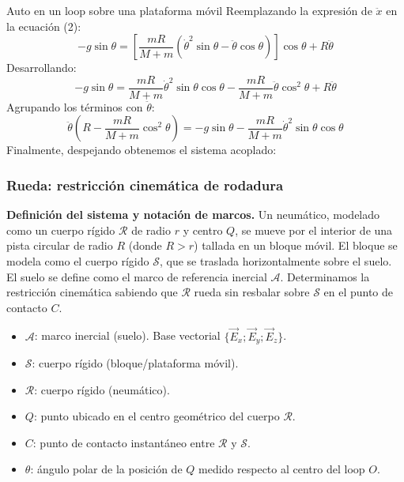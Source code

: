 \begin{solucion}{Auto en un loop sobre una plataforma móvil}
Reemplazando la expresión de $\ddot{x}$ en la ecuación (2):
\begin{equation*}
-g\sin\theta = \left[ \frac{mR}{M+m}\left(\dot{\theta}^2\sin\theta - \ddot{\theta}\cos\theta\right) \right]\cos\theta + R\ddot{\theta}
\end{equation*}
Desarrollando:
\begin{equation*}
-g\sin\theta = \frac{mR}{M+m}\dot{\theta}^2\sin\theta\cos\theta - \frac{mR}{M+m}\ddot{\theta}\cos^2\theta + R\ddot{\theta}
\end{equation*}
Agrupando los términos con $\ddot{\theta}$:
\begin{equation*}
\ddot{\theta} \left( R - \frac{mR}{M+m}\cos^2\theta \right) = -g\sin\theta - \frac{mR}{M+m}\dot{\theta}^2\sin\theta\cos\theta
\end{equation*}
Finalmente, despejando obtenemos el sistema acoplado:

\subsubsection*{Rueda: restricción cinemática de rodadura}

\textbf{Definición del sistema y notación de marcos.}
Un neumático, modelado como un cuerpo rígido $\mathcal{R}$ de radio $r$ y centro $Q$, se mueve por el interior de una pista circular de radio $R$ (donde $R > r$) tallada en un bloque móvil. El bloque se modela como el cuerpo rígido $\mathcal{S}$, que se traslada horizontalmente sobre el suelo. El suelo se define como el marco de referencia inercial $\mathcal{A}$. Determinamos la restricción cinemática sabiendo que $\mathcal{R}$ rueda sin resbalar sobre $\mathcal{S}$ en el punto de contacto $C$.
\begin{itemize}
  \item $\mathcal{A}$: marco inercial (suelo). Base vectorial $\{\vec{E}_x;\vec{E}_y;\vec{E}_z\}$.
  \item $\mathcal{S}$: cuerpo rígido (bloque/plataforma móvil).
  \item $\mathcal{R}$: cuerpo rígido (neumático).
  \item $Q$: punto ubicado en el centro geométrico del cuerpo $\mathcal{R}$.
  \item $C$: punto de contacto instantáneo entre $\mathcal{R}$ y $\mathcal{S}$.
  \item $\theta$: ángulo polar de la posición de $Q$ medido respecto al centro del loop $O$.
\end{itemize}


\end{solucion}
